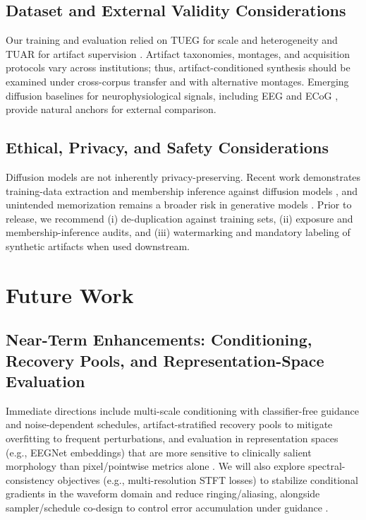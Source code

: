 \documentclass{article}
\begin{document}
\subsection{Dataset and External Validity Considerations}
Our training and evaluation relied on TUEG for scale and heterogeneity and TUAR for artifact supervision \citep{obeid2016tueg,hamid2020tuar}. Artifact taxonomies, montages, and acquisition protocols vary across institutions; thus, artifact-conditioned synthesis should be examined under cross-corpus transfer and with alternative montages. Emerging diffusion baselines for neurophysiological signals, including EEG and ECoG \citep{tosato2023eegdiffusion,vetter2024nddm}, provide natural anchors for external comparison.

\subsection{Ethical, Privacy, and Safety Considerations}
Diffusion models are not inherently privacy-preserving. Recent work demonstrates training-data extraction and membership inference against diffusion models \citep{carlini2023extracting,duan2023mia,matsumoto2023mia}, and unintended memorization remains a broader risk in generative models \citep{carlini2019secretsharer}. Prior to release, we recommend (i) de-duplication against training sets, (ii) exposure and membership-inference audits, and (iii) watermarking and mandatory labeling of synthetic artifacts when used downstream.




\section{Future Work}

\subsection{Near-Term Enhancements: Conditioning, Recovery Pools, and Representation-Space Evaluation}
Immediate directions include multi-scale conditioning with classifier-free guidance and noise-dependent schedules, artifact-stratified recovery pools to mitigate overfitting to frequent perturbations, and evaluation in representation spaces (e.g., EEGNet embeddings) that are more sensitive to clinically salient morphology than pixel/pointwise metrics alone \citep{nichol2021improved,ho2022cfg,lawhern2018eegnet}. We will also explore spectral-consistency objectives (e.g., multi-resolution STFT losses) to stabilize conditional gradients in the waveform domain and reduce ringing/aliasing, alongside sampler/schedule co-design to control error accumulation under guidance \citep{yamamoto2020parallelwavegan,karras2022edm}.
\end{document}
